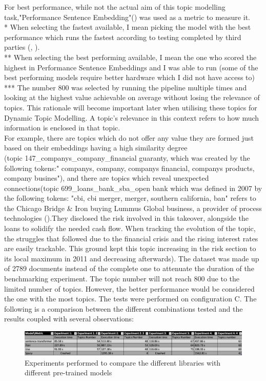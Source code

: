 \documentclass[12pt,MSc,a4paper,oneside]{muthesis}
\begin{document}
    For best performance, while not the actual aim of this topic modelling task,"Performance Sentence Embedding"(\cite{DBLP:journals/corr/abs-2101-10642}) was used as a metric to measure it. \\
    * When selecting the fastest available, I mean picking the model with the best performance which runs the fastest according to testing completed by third parties (\cite{grootendorst2020bertopic}, \cite{sbert-models}). \\
    ** When selecting the best performing available, I mean the one who scored the highest in Performance Sentence Embeddings and I was able to run (some of the best performing models require better hardware which I did not have access to) \\
    *** The number 800 was selected by running the pipeline multiple times and looking at the highest value achievable on average without losing the relevance of topics. This rationale will become important later when utilising these topics for Dynamic Topic Modelling. A topic's relevance in this context refers to how much information is enclosed in that topic. \\
    For example, there are topics which do not offer any value they are formed just based on their embeddings having a high similarity degree \\ (topic 147\_companys\_company\_financial guaranty, which was created by the following tokens:" companys, company, companys financial, companys products, company busines"), and there are topics which reveal unexpected connections(topic 699\_loans\_bank\_sba\_open bank which was defined in 2007 by the following tokens: "cbi, cbi merger, merger, southern california, ban" refers to the Chicago Bridge & Iron buying Lummus Global business, a provider of process technologies (\cite{topic-modelling-example}).They disclosed the risk involved in this takeover, alongside the loans to solidify the needed cash flow. When tracking the evolution of the topic, the struggles that followed due to the financial crisis and the rising interest rates are easily trackable. This ground kept this topic increasing in the risk section to its local maximum in 2011 and decreasing afterwards).
    The dataset was made up of 2789 documents instead of the complete one to attenuate the duration of the benchmarking experiment. The topic number will not reach 800 due to the limited number of topics. However, the better performance would be considered the one with the most topics. The tests were performed on configuration C.
    The following is a comparison between the different combinations tested and the results coupled with several observations:
    \begin{figure}[h]
      \centering
      \includegraphics[scale=0.37]{embeddings_comparasion.png}
      \caption{Experiments performed to compare the different libraries with different pre-trained models}
    \end{figure}
\end{document}
